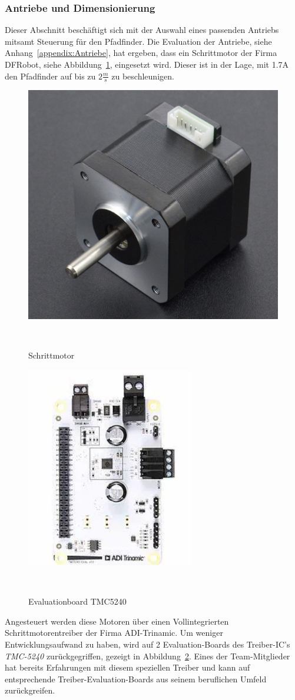 \documentclass[main.tex]{subfiles} %
\begin{document}

\subsubsection{Antriebe und Dimensionierung}

Dieser Abschnitt beschäftigt sich mit der Auswahl eines passenden Antriebs
mitsamt Steuerung für den Pfadfinder. Die Evaluation der Antriebe, siehe
Anhang~\ref{appendix:Antriebe}, hat ergeben, dass ein Schrittmotor der Firma
DFRobot, siehe Abbildung~\ref{Schrittmotor_FIT0278}, eingesetzt wird. Dieser
ist in der Lage, mit 1.7A den Pfadfinder auf bis zu $2\frac{m}{s}$ zu
beschleunigen.

\begin{figure}[H]
    \centering
    \includegraphics[width = 0.25 \linewidth]{fig_Antriebe_und_Dimensionierung/DFRobot_Stepper_FIT0278.png}
    \caption{Schrittmotor}~\label{Schrittmotor_FIT0278}
\end{figure}

\begin{figure}[H]
    \centering
    \includegraphics[width = 0.25 \linewidth]{fig_Antriebe_und_Dimensionierung/TMC_5240_EVAL.png}
    \caption{Evaluationboard TMC5240}~\label{Schrittmotorentreiber_EVAL}
\end{figure}

Angesteuert werden diese Motoren über einen Vollintegrierten
Schrittmotorentreiber der Firma ADI-Trinamic. Um weniger Entwicklungsaufwand zu
haben, wird auf 2 Evaluation-Boards des Treiber-IC's \textit{TMC-5240}
zurückgegriffen, gezeigt in Abbildung~\ref{Schrittmotorentreiber_EVAL}. Eines
der Team-Mitglieder hat bereits Erfahrungen mit diesem speziellen Treiber und
kann auf entsprechende Treiber-Evaluation-Boards aus seinem beruflichen Umfeld
zurückgreifen.
\end{document}

